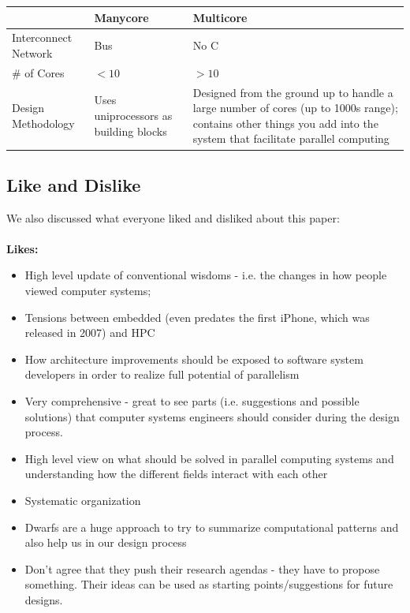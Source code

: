 \begin{center}
    \begin{tabular}{p{5cm} | p{5cm} p{5cm}}
        \toprule
        & Manycore & Multicore \\
        \midrule
        Interconnect Network & Bus & No C \\
        \# of Cores & \( <10 \) & \( >10 \) \\
        Design Methodology & Uses uniprocessors as building blocks & Designed from the ground up to handle a large number of cores (up to 1000s range); contains other things you add into the system that facilitate parallel computing \\
        \bottomrule
    \end{tabular}
\end{center}

\subsection{Like and Dislike}\label{feb-11:a-view:like-dislike}
We also discussed what everyone liked and disliked about this paper:
\\ \\
\textbf{Likes:}

\begin{itemize}
    \item High level update of conventional wisdoms - i.e. the changes in how people viewed computer systems; 
    \item Tensions between embedded (even predates the first iPhone, which was released in 2007) and HPC
    \item How architecture improvements should be exposed to software system developers in order to realize full potential of parallelism
     \item Very comprehensive - great to see parts (i.e. suggestions and possible solutions) that computer systems engineers should consider during the design process.
     \item High level view on what should be solved in parallel computing systems and understanding how the different fields interact with each other
      \item Systematic organization
      \item Dwarfs are a huge approach to try to summarize computational patterns and also help us in our design process
      \item Don't agree that they push their research agendas - they have to propose something. Their ideas can be used as starting points/suggestions for future designs.
\end{itemize}

